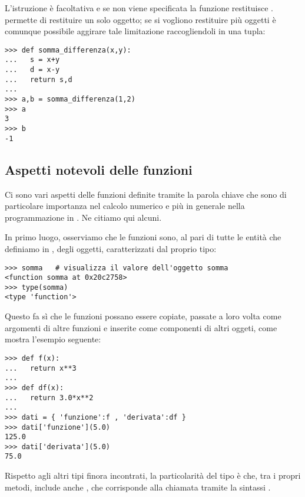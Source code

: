 L'istruzione  \`e facoltativa e se non viene specificata
la funzione restituisce .  permette di
restituire un solo oggetto; se si vogliono restituire pi\`u oggetti
\`e comunque possibile aggirare tale limitazione raccogliendoli in una
tupla:
\begin{verbatim}
>>> def somma_differenza(x,y):
...   s = x+y
...   d = x-y
...   return s,d
... 
>>> a,b = somma_differenza(1,2)
>>> a
3
>>> b
-1
\end{verbatim}

\subsection{Aspetti notevoli delle funzioni}
Ci sono vari aspetti delle funzioni definite tramite la parola chiave
 che sono di particolare importanza nel calcolo numerico e
pi\`u in generale nella programmazione in \python. Ne citiamo qui
alcuni.

In primo luogo, osserviamo che le funzioni sono, al pari di tutte le
entit\`a che definiamo in \python, degli oggetti, caratterizzati dal
proprio tipo:
\begin{verbatim}
>>> somma   # visualizza il valore dell'oggetto somma
<function somma at 0x20c2758>
>>> type(somma)
<type 'function'>
\end{verbatim}
Questo fa s\`i che le funzioni possano essere copiate, passate a loro
volta come argomenti di altre funzioni e inserite come componenti di
altri oggeti, come mostra l'esempio seguente:
\begin{verbatim}
>>> def f(x):
...   return x**3
... 
>>> def df(x):
...   return 3.0*x**2
... 
>>> dati = { 'funzione':f , 'derivata':df }
>>> dati['funzione'](5.0)
125.0
>>> dati['derivata'](5.0)
75.0
\end{verbatim}
Rispetto agli altri tipi finora incontrati, la particolarit\`a del
tipo  \`e che, tra i propri metodi, include anche
, che corrisponde alla chiamata tramite la sintassi
.

